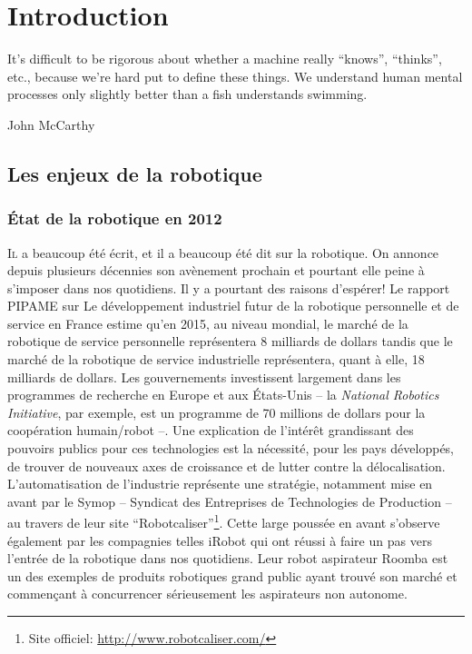 \chapter{Introduction}\label{chap:chap0}

\epigraph{It's difficult to be rigorous about whether a machine really
  ``knows'', ``thinks'', etc., because we're hard put to define these
  things. We understand human mental processes only slightly better
  than a fish understands swimming.}{John McCarthy}
\clearpage

\section{Les enjeux de la robotique}

\subsection{État de la robotique en 2012}

\lettrine[lines=2, lraise=0.1, nindent=0em, slope=-.5em]%
{I}{l} a beaucoup été écrit, et il a beaucoup été dit sur la robotique. On
annonce depuis plusieurs décennies son avènement prochain et pourtant
elle peine à s'imposer dans nos quotidiens. Il y a pourtant des
raisons d'espérer! Le rapport PIPAME sur Le développement industriel
futur de la robotique personnelle et de service en France
\citep{12erdyn} estime qu'en 2015, au niveau mondial, le marché de la
robotique de service personnelle représentera 8 milliards de dollars
tandis que le marché de la robotique de service industrielle
représentera, quant à elle, 18 milliards de dollars. Les gouvernements
investissent largement dans les programmes de recherche en Europe et
aux États-Unis -- la \emph{National Robotics Initiative}, par exemple,
est un programme de 70 millions de dollars pour la coopération
humain/robot --. Une explication de l'intérêt grandissant des pouvoirs
publics pour ces technologies est la nécessité, pour les pays
développés, de trouver de nouveaux axes de croissance et de lutter
contre la délocalisation. L'automatisation de l'industrie représente
une stratégie, notamment mise en avant par le Symop -- Syndicat des
Entreprises de Technologies de Production -- au travers de leur site
``Robotcaliser''\footnote{Site officiel:
  \url{http://www.robotcaliser.com/}}. Cette large poussée en avant
s'observe également par les compagnies telles iRobot qui ont réussi à
faire un pas vers l'entrée de la robotique dans nos quotidiens. Leur
robot aspirateur Roomba est un des exemples de produits robotiques
grand public ayant trouvé son marché et commençant à concurrencer
sérieusement les aspirateurs non autonome.


